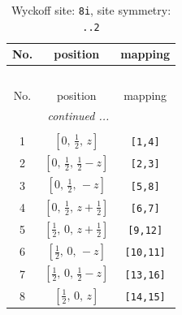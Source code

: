 \documentclass[fleqn,8pt]{jsarticle}
\begin{document}
\begin{longtable}{ccc}
\caption{Wyckoff site: {\tt 8i}, site symmetry: {\tt ..2}}
 \\
 \hline \hline
No. & position & mapping \\ \hline \endfirsthead

\multicolumn{2}{l}{\tablename\ \thetable{}} \\
 \hline \hline
No. & position & mapping \\ \hline \endhead

 \hline \hline
\multicolumn{2}{r}{\footnotesize\it continued ...} \\ \endfoot

 \hline \hline
\multicolumn{2}{r}{} \\ \endlastfoot

1 & $\left[ 0,\, \frac{1}{2},\, z \right]$ & {\tt [1,4]} \\ \hline
2 & $\left[ 0,\, \frac{1}{2},\, \frac{1}{2} - z \right]$ & {\tt [2,3]} \\ \hline
3 & $\left[ 0,\, \frac{1}{2},\, - z \right]$ & {\tt [5,8]} \\ \hline
4 & $\left[ 0,\, \frac{1}{2},\, z + \frac{1}{2} \right]$ & {\tt [6,7]} \\ \hline
5 & $\left[ \frac{1}{2},\, 0,\, z + \frac{1}{2} \right]$ & {\tt [9,12]} \\ \hline
6 & $\left[ \frac{1}{2},\, 0,\, - z \right]$ & {\tt [10,11]} \\ \hline
7 & $\left[ \frac{1}{2},\, 0,\, \frac{1}{2} - z \right]$ & {\tt [13,16]} \\ \hline
8 & $\left[ \frac{1}{2},\, 0,\, z \right]$ & {\tt [14,15]} \\
\end{longtable}
\renewcommand{\arraystretch}{1.2}
\end{document}
